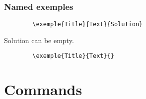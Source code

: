 \documentclass[french]{article}
\begin{document}
    \subsubsection{Named exemples}

    \begin{verbatim}
        \exemple{Title}{Text}{Solution}
    \end{verbatim}


    \begin{warning}
        Solution can be empty.
    \end{warning}
    
    \begin{verbatim}
        \exemple{Title}{Text}{}
    \end{verbatim}


\section{Commands}
\end{document}
